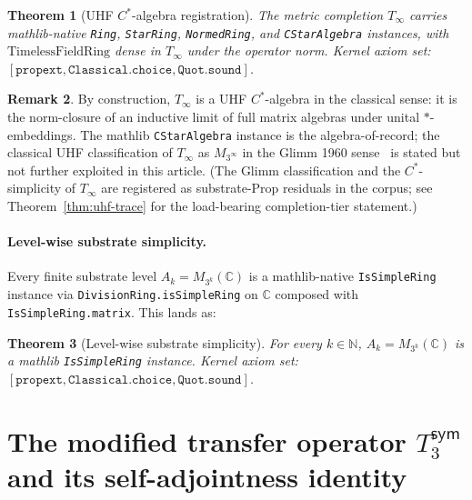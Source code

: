 \documentclass[11pt,a4paper]{amsart}
\theoremstyle{plain}
\newtheorem{theorem}{Theorem}[section]
\theoremstyle{definition}
\newtheorem{remark}[theorem]{Remark}
\begin{document}
\begin{theorem}[UHF $C^*$-algebra registration]\label{thm:uhf-registration}
The metric completion $T_\infty$ carries mathlib-native \texttt{Ring}, \texttt{StarRing}, \texttt{NormedRing}, and \texttt{CStarAlgebra} instances, with $\mathrm{TimelessFieldRing}$ dense in $T_\infty$ under the operator norm. Kernel axiom set: $[\texttt{propext}, \texttt{Classical.choice}, \texttt{Quot.sound}]$.
\end{theorem}

\begin{remark}
By construction, $T_\infty$ is a UHF $C^*$-algebra in the classical sense: it is the norm-closure of an inductive limit of full matrix algebras under unital $*$-embeddings. The mathlib \texttt{CStarAlgebra} instance is the algebra-of-record; the classical UHF classification of $T_\infty$ as $M_{3^\infty}$ in the Glimm 1960 sense~\cite{glimm1960} is stated but not further exploited in this article. (The Glimm classification and the $C^*$-simplicity of $T_\infty$ are registered as substrate-Prop residuals in the corpus; see Theorem~\ref{thm:uhf-trace} for the load-bearing completion-tier statement.)
\end{remark}

\paragraph{Level-wise substrate simplicity.} Every finite substrate level $A_k = M_{3^k}(\mathbb{C})$ is a mathlib-native \texttt{IsSimpleRing} instance via \texttt{DivisionRing.isSimpleRing} on $\mathbb{C}$ composed with \texttt{IsSimpleRing.matrix}. This lands as:

\begin{theorem}[Level-wise substrate simplicity]\label{thm:simple}
For every $k \in \mathbb{N}$, $A_k = M_{3^k}(\mathbb{C})$ is a mathlib \texttt{IsSimpleRing} instance. Kernel axiom set: $[\texttt{propext}, \texttt{Classical.choice}, \texttt{Quot.sound}]$.
\end{theorem}

\section{The modified transfer operator $T_3^{\textsf{sym}}$ and its self-adjointness identity}\label{sec:t3sym}
\end{document}
